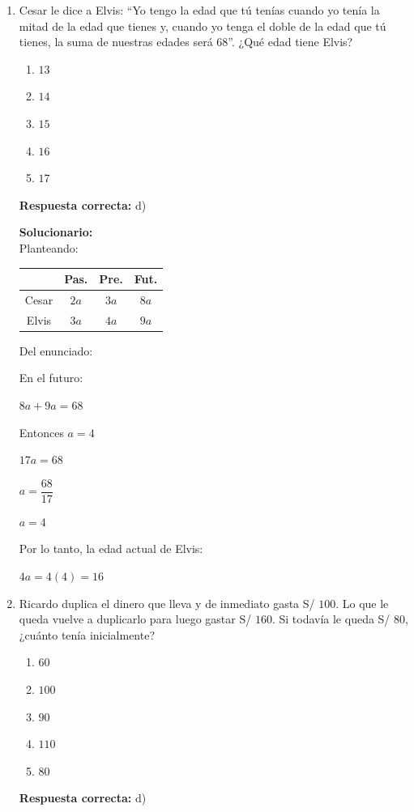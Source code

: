 \begin{enumerate}
	\vspace{6mm}
	
	\item Cesar le dice a Elvis: ``Yo tengo la edad que tú tenías cuando yo tenía la mitad de la edad que tienes y, cuando yo tenga el doble de la edad que tú tienes, la suma de nuestras edades será $68$''. ¿Qué edad tiene Elvis?
	\begin{enumerate}[label=\alph*)]
		\item $13$
		\item $14$
		\item $15$
		\item $16$
		\item $17$
	\end{enumerate}
	\textbf{Respuesta correcta:} d)
	
	\vspace{2mm}
	\textbf{Solucionario:}\\
	
	Planteando:
	
	\begin{center}
		\begin{tabular}{c|c|c|c}
			& Pas. & Pre. & Fut. \\
			\hline
			Cesar & $2a$ & $3a$ & $8a$ \\
			Elvis & $3a$ & $4a$ & $9a$
		\end{tabular}
	\end{center}
	
	Del enunciado:
	
	En el futuro:
	
	$8a+9a=68$
	
	Entonces $a=4$
	
	$17a=68$
	
	$a=\dfrac{68}{17}$
	
	$a=4$
	
	Por lo tanto, la edad actual de Elvis:
	
	$4a=4(4)=16$
	
	
	\vspace{6mm}
	
	\item Ricardo duplica el dinero que lleva y de inmediato gasta S/ $100$. Lo que le queda vuelve a duplicarlo para luego gastar S/ $160$. Si todavía le queda S/ $80$, ¿cuánto tenía inicialmente?
	\begin{enumerate}[label=\alph*)]
		\item $60$
		\item $100$
		\item $90$
		\item $110$
		\item $80$
	\end{enumerate}
	\textbf{Respuesta correcta:} d)
	

\end{enumerate}

